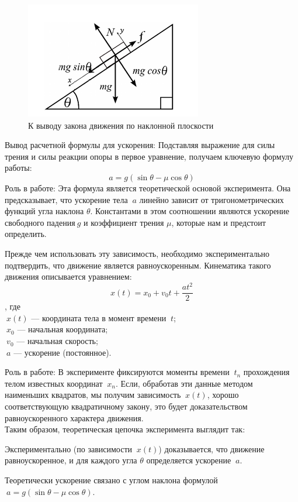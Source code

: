 \documentclass[a4paper, 12pt]{article}
\begin{document}
\begin{figure}[h]
\centering
\includegraphics[width=0.4\linewidth]{НАКЛ ПЛОС.png}
\caption{К выводу закона движения по наклонной плоскости }
\label{fig:voltage_current}
\end{figure}





Вывод расчетной формулы для ускорения:
Подставляя выражение для силы трения и силы реакции опоры в первое уравнение, получаем ключевую формулу работы:
\[ a = g (\sin \theta - \mu \cos \theta) \]
Роль в работе: Эта формула является теоретической основой эксперимента. Она предсказывает, что ускорение тела \(\ a\) линейно зависит от тригонометрических функций угла наклона \(\theta\). Константами в этом соотношении являются ускорение свободного падения\(\ g\)  и коэффициент трения \(\mu\), которые нам и предстоит определить.

Прежде чем использовать эту зависимость, необходимо экспериментально подтвердить, что движение является равноускоренным. Кинематика такого движения описывается уравнением:
\[ x(t) = x_0 + v_0 t + \frac{a t^2}{2} \], где\\ \(\ x(t)\) — координата тела в момент времени \(\ t\);\\
\(\ x_0\) — начальная координата;\\
\(\ v_0\) — начальная скорость;\\
\(\ a\) — ускорение (постоянное).

Роль в работе: В эксперименте фиксируются моменты времени \(\ t_n\) прохождения телом известных координат \(\ x_n\). Если, обработав эти данные методом наименьших квадратов, мы получим зависимость \(\ x(t)\), хорошо соответствующую квадратичному закону, это будет доказательством равноускоренного характера движения.\\
Таким образом, теоретическая цепочка эксперимента выглядит так:

Экспериментально (по зависимости \(\ x(t)\)) доказывается, что движение равноускоренное, и для каждого угла \(\theta\) определяется ускорение \(\ a\).

Теоретически ускорение связано с углом наклона формулой \(\ a = g (\sin \theta - \mu \cos \theta)\).
\end{document}
